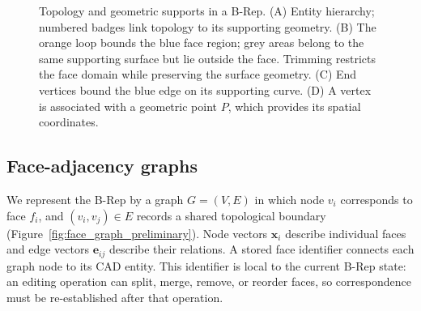 \documentclass[12pt,a4paper]{article}
\begin{document}
\begin{figure}[!ht]
\caption{Topology and geometric supports in a B-Rep. (A) Entity hierarchy; numbered badges link topology to its supporting geometry. (B) The orange loop bounds the blue face region; grey areas belong to the same supporting surface but lie outside the face. Trimming restricts the face domain while preserving the surface geometry. (C) End vertices bound the blue edge on its supporting curve. (D) A vertex is associated with a geometric point $P$, which provides its spatial coordinates.}\label{fig:brep_preliminary}
\end{figure}
\subsection{Face-adjacency graphs}\label{sec:face_graph_preliminary}

We represent the B-Rep by a graph $G=(V,E)$ in which node $v_i$ corresponds to face $f_i$, and $(v_i,v_j)\in E$ records a shared topological boundary (Figure~\ref{fig:face_graph_preliminary}). Node vectors $\mathbf{x}_i$ describe individual faces and edge vectors $\mathbf{e}_{ij}$ describe their relations. A stored face identifier connects each graph node to its CAD entity. This identifier is local to the current B-Rep state: an editing operation can split, merge, remove, or reorder faces, so correspondence must be re-established after that operation.
\end{document}

